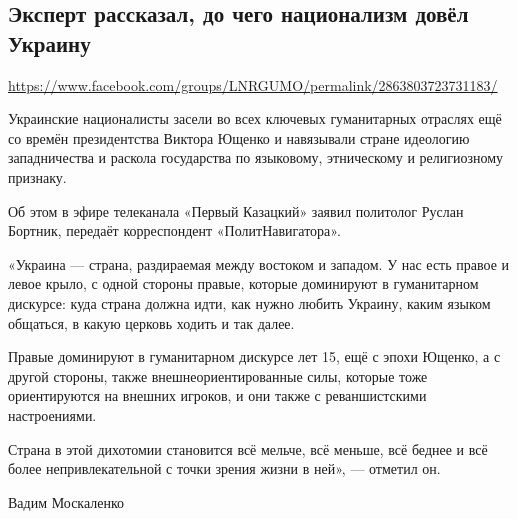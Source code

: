  
 
  
\subsection{Эксперт рассказал, до чего национализм довёл Украину}
\label{sec:21_07_2020.fb.lnr.18}
\url{https://www.facebook.com/groups/LNRGUMO/permalink/2863803723731183/}


Украинские националисты засели во всех ключевых гуманитарных отраслях ещё со
времён президентства Виктора Ющенко и навязывали стране идеологию западничества
и раскола государства по языковому, этническому и религиозному признаку.

Об этом в эфире телеканала «Первый Казацкий» заявил политолог Руслан Бортник,
передаёт корреспондент «ПолитНавигатора».

«Украина --- страна, раздираемая между востоком и западом. У нас есть правое и
левое крыло, с одной стороны правые, которые доминируют в гуманитарном
дискурсе: куда страна должна идти, как нужно любить Украину, каким языком
общаться, в какую церковь ходить и так далее.

Правые доминируют в гуманитарном дискурсе лет 15, ещё с эпохи Ющенко, а с
другой стороны, также внешнеориентированные силы, которые тоже ориентируются на
внешних игроков, и они также с реваншистскими настроениями.

Страна в этой дихотомии становится всё мельче, всё меньше, всё беднее и всё
более непривлекательной с точки зрения жизни в ней», --- отметил он.

Вадим Москаленко
